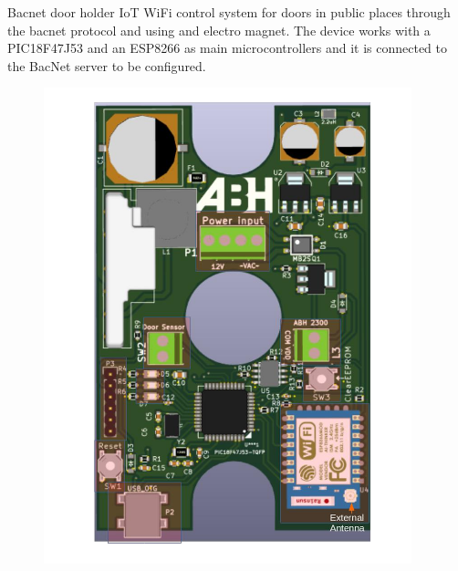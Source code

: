 \documentclass[aspectratio=169]{beamer}
\begin{document}
\begin{frame}{Bacnet door holder}
  IoT WiFi control system for doors in public places through the bacnet
  protocol and using and electro magnet. The device works with a PIC18F47J53 
  and an ESP8266 as main microcontrollers and it is connected to the BacNet 
  server to be configured.

  \begin{figure}[H]
    \centering
    \begin{columns}[T]
      \begin{column}{.24\linewidth}
        \includegraphics[width=\linewidth]{images/BacnetDoorHolder1}
      \end{column}
      \begin{column}{.2\linewidth}

\end{column}
\end{columns}
\end{figure}
\end{frame}
\end{document}
